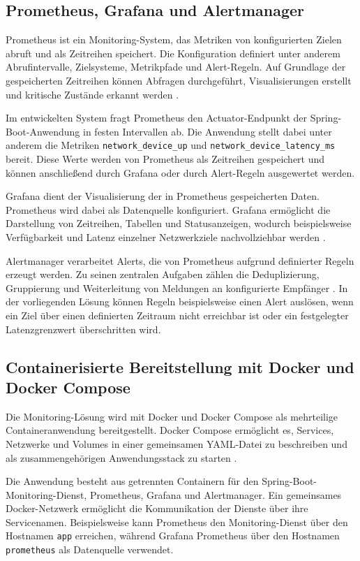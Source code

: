 \subsection{Prometheus, Grafana und Alertmanager}

Prometheus ist ein Monitoring-System, das Metriken von konfigurierten Zielen abruft und als Zeitreihen speichert. Die Konfiguration definiert unter anderem Abrufintervalle, Zielsysteme, Metrikpfade und Alert-Regeln. Auf Grundlage der gespeicherten Zeitreihen können Abfragen durchgeführt, Visualisierungen erstellt und kritische Zustände erkannt werden \cite{prometheus:configuration}.

Im entwickelten System fragt Prometheus den Actuator-Endpunkt der Spring-Boot-Anwendung in festen Intervallen ab. Die Anwendung stellt dabei unter anderem die Metriken \texttt{network\_device\_up} und \texttt{network\_device\_latency\_ms} bereit. Diese Werte werden von Prometheus als Zeitreihen gespeichert und können anschließend durch Grafana oder durch Alert-Regeln ausgewertet werden.

Grafana dient der Visualisierung der in Prometheus gespeicherten Daten. Prometheus wird dabei als Datenquelle konfiguriert. Grafana ermöglicht die Darstellung von Zeitreihen, Tabellen und Statusanzeigen, wodurch beispielsweise Verfügbarkeit und Latenz einzelner Netzwerkziele nachvollziehbar werden \cite{grafana:prometheus-datasource}.

Alertmanager verarbeitet Alerts, die von Prometheus aufgrund definierter Regeln erzeugt werden. Zu seinen zentralen Aufgaben zählen die Deduplizierung, Gruppierung und Weiterleitung von Meldungen an konfigurierte Empfänger \cite{prometheus:alertmanager}. In der vorliegenden Lösung können Regeln beispielsweise einen Alert auslösen, wenn ein Ziel über einen definierten Zeitraum nicht erreichbar ist oder ein festgelegter Latenzgrenzwert überschritten wird.

\subsection{Containerisierte Bereitstellung mit Docker und Docker Compose}

Die Monitoring-Lösung wird mit Docker und Docker Compose als mehrteilige Containeranwendung bereitgestellt. Docker Compose ermöglicht es, Services, Netzwerke und Volumes in einer gemeinsamen YAML-Datei zu beschreiben und als zusammengehörigen Anwendungsstack zu starten \cite{docker:compose}.

Die Anwendung besteht aus getrennten Containern für den Spring-Boot-Monitoring-Dienst, Prometheus, Grafana und Alertmanager. Ein gemeinsames Docker-Netzwerk ermöglicht die Kommunikation der Dienste über ihre Servicenamen. Beispielsweise kann Prometheus den Monitoring-Dienst über den Hostnamen \texttt{app} erreichen, während Grafana Prometheus über den Hostnamen \texttt{prometheus} als Datenquelle verwendet.

